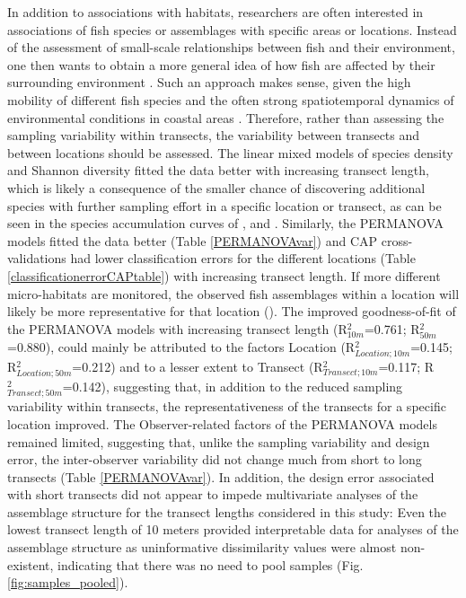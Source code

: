 \documentclass[10pt,letterpaper]{article}
\begin{document}
In addition to associations with habitats, researchers are often interested in associations of fish species or assemblages with specific areas or locations. Instead of the assessment of small-scale relationships between fish and their environment, one then wants to obtain a more general idea of how fish are affected by their surrounding environment \cite{Bacheler2016}. Such an approach makes sense, given the high mobility of different fish species and the often strong spatiotemporal dynamics of environmental conditions in coastal areas \cite{Bruneel2018}. Therefore, rather than assessing the sampling variability within transects, the variability between transects and between locations should be assessed. The linear mixed models of species density and Shannon diversity fitted the data better with increasing transect length, which is likely a consequence of the smaller chance of discovering additional species with further sampling effort in a specific location or transect, as can be seen in the species accumulation curves of ,  and . Similarly, the PERMANOVA models fitted the data better (Table \ref{PERMANOVAvar}) and CAP cross-validations had lower classification errors for the different locations (Table \ref{classificationerrorCAPtable}) with increasing transect length. If more different micro-habitats are monitored, the observed fish assemblages within a location will likely be more representative for that location (). 
The improved goodness-of-fit of the PERMANOVA models with increasing transect length (R$^{2}_{10m}$=0.761;  R$^{2}_{50m}$=0.880), could mainly be attributed to the factors Location (R$^{2}_{Location;10m}$=0.145;  R$^{2}_{Location;50m}$=0.212) and to a lesser extent to Transect (R$^{2}_{Transect;10m}$=0.117;  R$^{2}_{Transect;50m}$=0.142), suggesting that, in addition to the reduced sampling variability within transects, the representativeness of the transects for a specific location improved. The Observer-related factors of the PERMANOVA models remained limited, suggesting that, unlike the sampling variability and design error, the inter-observer variability did not change much from short to long transects (Table \ref{PERMANOVAvar}). In addition, the design error associated with short transects did not appear to impede multivariate analyses of the assemblage structure for the transect lengths considered in this study: Even the lowest transect length of 10 meters provided interpretable data for analyses of the assemblage structure as uninformative dissimilarity values were almost non-existent, indicating that there was no need to pool samples (Fig. \ref{fig:samples_pooled}).
\end{document}
